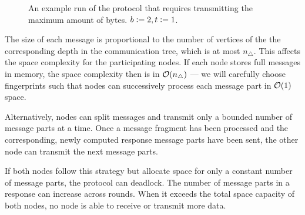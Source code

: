 \documentclass[conference]{IEEEtran}
\begin{document}
\begin{figure*}
\begin{scaletikzpicturetowidth}{\textwidth}
\end{scaletikzpicturetowidth}

\caption{An example run of the protocol that requires transmitting the maximum amount of bytes. $b \vcentcolon= 2, t \vcentcolon= 1$.}

\label{fig:worst-bytes}
\end{figure*}

The size of each message is proportional to the number of vertices of the the corresponding depth in the communication tree, which is at most $n_{\triangle}$. This affects the space complexity for the participating nodes. If each node stores full messages in memory, the space complexity then is in $\mathcal{O}(n_{\triangle})$ --- we will carefully choose fingerprints such that nodes can successively process each message part in $\mathcal{O}(1)$ space.

Alternatively, nodes can split messages and transmit only a bounded number of message parts at a time. Once a message fragment has been processed and the corresponding, newly computed response message parts have been sent, the other node can transmit the next message parts.

If both nodes follow this strategy but allocate space for only a constant number of message parts, the protocol can deadlock. The number of message parts in a response can increase across rounds. When it exceeds the total space capacity of both nodes, no node is able to receive or transmit more data.
\end{document}
